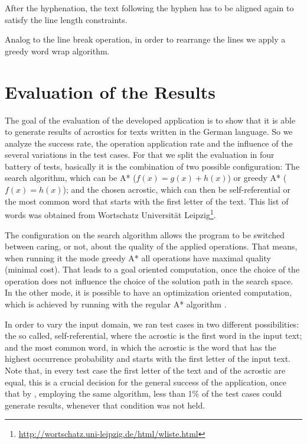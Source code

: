 \documentclass[11pt]{reportAlternative}
\begin{document}
After the hyphenation, the text following the hyphen has to be aligned again to satisfy the line length constraints.

Analog to the line break operation, in order to rearrange the lines we apply a greedy word wrap algorithm.

\chapter{Evaluation of the Results}
The goal of the evaluation of the developed application is to show that it is able to generate results of acrostics for texts written in the German language. So we analyze the success rate, the operation application rate and the influence of the several variations in the test cases. For that we split the evaluation in four battery of tests, basically it is the combination of two possible configuration: The search algorithm, which can be A* ($f(x) = g(x) + h(x)$) or greedy A* ($f(x) = h(x)$); and the chosen acrostic, which can then be self-referential or the most common word that starts with the first letter of the text. This list of words was obtained from Wortschatz Universität Leipzig\footnote{\url{http://wortschatz.uni-leipzig.de/html/wliste.html}}.

The configuration on the search algorithm allows the program to be switched between caring, or not, about the quality of the applied operations. That means, when running it the mode greedy A* all operations have maximal quality (minimal cost). That leads to a goal oriented computation, once the choice of the operation does not influence the choice of the solution path in the search space. In the other mode, it is possible to have an optimization oriented computation, which is achieved by running with the regular A* algorithm \cite{AStar}.

In order to vary the input domain, we ran test cases in two different possibilities: the so called, self-referential, where the acrostic is the first word in the input text; and the most common word, in which the acrostic is the word that has the highest occurrence probability and starts with the first letter of the input text. Note that, in every test case the first letter of the text and of the acrostic are equal, this is a crucial decision for the general success of the application, once that by \cite{Stein}, employing the same algorithm, less than 1\% of the test cases could generate results, whenever that condition was not held.
\end{document}
